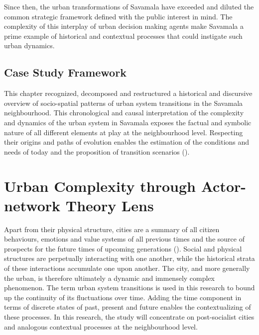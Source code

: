 \documentclass[11pt]{report}
\begin{document}
Since then, the urban transformations of Savamala have exceeded and diluted the common strategic framework defined with the public interest in mind.  The complexity of this interplay of urban decision making agents make Savamala a prime example of historical and contextual processes that could instigate such urban dynamics.

\section{Case Study Framework}

This chapter recognized, decomposed and restructured a historical and discursive overview of socio-spatial patterns of urban system transitions in the Savamala neighbourhood.
This chronological and causal interpretation of the complexity and dynamics of the urban system in Savamala exposes the factual and symbolic nature of all different elements at play at the neighbourhood level.
Respecting their origins and paths of evolution enables the estimation of the conditions and needs of today and the proposition of transition scenarios (\href{Grozdanic}{\citealt{grozdanic_belgrade_2008}}).



\chapter{Urban Complexity through Actor-network Theory Lens}

Apart from their physical structure, cities are a summary of all citizen behaviours, emotions and value systems of all previous times and the source of prospects for the future times of upcoming generations  (\href{Stojkov}{\citealt{stojkov_grad_2013}}).
Social and physical structures are perpetually interacting with one another, while the historical strata of these interactions accumulate one upon another. The city, and more generally the urban, is therefore ultimately a dynamic and immensely complex phenomenon. The term urban system transitions is used in this research to bound up the continuity of its fluctuations over time. Adding the time component in terms of discrete states of past, present and future enables the contextualizing of these processes. In this research, the study will concentrate on post-socialist cities and analogous contextual processes at the neighbourhood level.
\\
\end{document}
